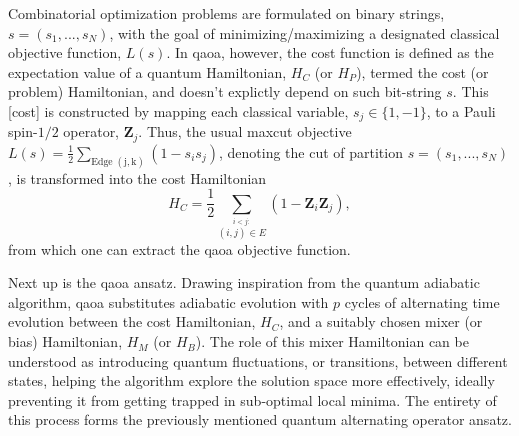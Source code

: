 Combinatorial optimization problems are formulated on binary strings, $s = (s_1,...,s_N)$, with the goal of minimizing/maximizing a designated classical objective function, $L(s)$. In \acrshort{qaoa}, however, the cost function is defined as the expectation value of a quantum Hamiltonian, $H_C$ (or $H_P$), termed the cost (or problem) Hamiltonian, and doesn't explictly depend on such bit-string $s$. This [cost] is constructed by mapping each classical variable, $s_j \in \{1, -1\}$, to a Pauli spin-$1/2$ operator, $\boldsymbol{Z}_j$. Thus, the usual \acrshort{maxcut} objective $L(s) = \frac{1}{2}\sum_{\mathrm{Edge}\;(\mathrm{j,k})}(1-s_{i}s_{j})$, denoting the cut of partition $s = (s_1,...,s_N)$, is transformed into the cost Hamiltonian
\begin{equation}\label{eq:H_C}
  H_C = \frac{1}{2}\sum_{\stackrel{i < j:}{(i,j)\in E}}(1-\boldsymbol{Z}_i\boldsymbol{Z}_j),
\end{equation}
from which one can extract the \acrshort{qaoa} objective function.

Next up is the \acrshort{qaoa} ansatz. Drawing inspiration from the quantum adiabatic algorithm, \acrshort{qaoa} substitutes adiabatic evolution with $p$ cycles of alternating time evolution between the cost Hamiltonian, $H_C$, and a suitably chosen mixer (or bias) Hamiltonian, $H_M$ (or $H_B$). The role of this mixer Hamiltonian can be understood as introducing quantum fluctuations, or transitions, between different states, helping the algorithm explore the solution space more effectively, ideally preventing it from getting trapped in sub-optimal local minima. The entirety of this process forms the previously mentioned quantum alternating operator ansatz.

